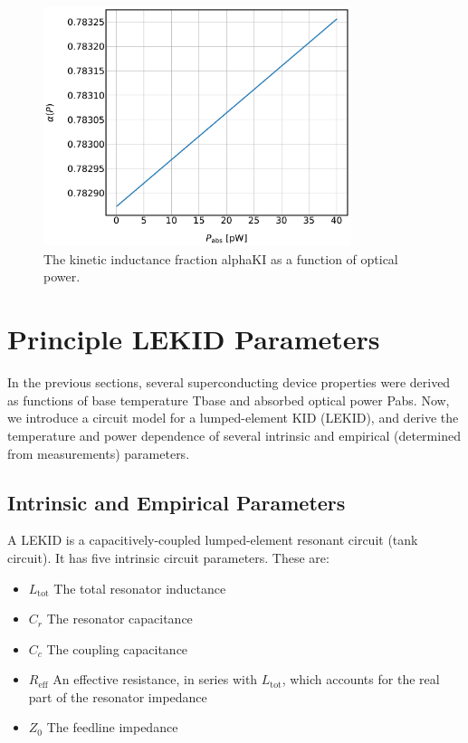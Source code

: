 \begin{figure}[!htbp]
\centering
\includegraphics[width=0.8\textwidth]{figures/kid_model/alpha_P}
\caption[~ as a function of absorbed power.]{The kinetic inductance fraction \gls{alphaKI} as a function of optical power.}
\label{fig:alpha_P}
\end{figure}

\section{Principle LEKID Parameters}\label{sec:kid_params}

In the previous sections, several superconducting device properties were derived as functions of base temperature \gls{Tbase} and absorbed optical power \gls{Pabs}. Now, we introduce a circuit model for a lumped-element KID (LEKID), and derive the temperature and power dependence of several intrinsic and empirical (determined from measurements) parameters.

\subsection{Intrinsic and Empirical Parameters}

A LEKID is a capacitively-coupled lumped-element resonant circuit (tank circuit). It has five intrinsic circuit parameters. These are:

\begin{itemize}[label={},nosep]
  \item $L_{\mathrm{tot}}$ \quad The total resonator inductance
  \item $C_{r}$ \quad The resonator capacitance
  \item $C_{c}$ \quad The coupling capacitance
  \item $R_{\mathrm{eff}}$ \quad An effective resistance, in series with $L_{\mathrm{tot}}$, which accounts for the real part of the resonator impedance
  \item $Z_{0}$ \quad The feedline impedance
\end{itemize}

